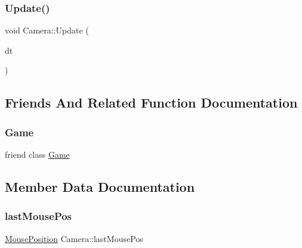 \mbox{\label{class_camera_ac8e78ac212afde90f72d59b3795474d0}} 
\subsubsection{\texorpdfstring{Update()}{Update()}}
{\footnotesize\ttfamily void Camera\+::\+Update (\begin{DoxyParamCaption}\item[{G\+Lfloat}]{dt }\end{DoxyParamCaption})}



\subsection{Friends And Related Function Documentation}
\mbox{\label{class_camera_aa2fab026580d6f14280c2ffb8063a314}} 
\subsubsection{\texorpdfstring{Game}{Game}}
{\footnotesize\ttfamily friend class \mbox{\hyperlink{class_game}{Game}}\hspace{0.3cm}{\ttfamily [friend]}}



\subsection{Member Data Documentation}
\mbox{\label{class_camera_a452e0aabdcd36e235c2f8705b736482c}} 
\subsubsection{\texorpdfstring{lastMousePos}{lastMousePos}}
{\footnotesize\ttfamily \mbox{\hyperlink{struct_mouse_position}{Mouse\+Position}} Camera\+::last\+Mouse\+Pos\hspace{0.3cm}{\ttfamily [protected]}}

\mbox{\label{class_camera_a481e669a6f96826929e323706543a6a4}} 
